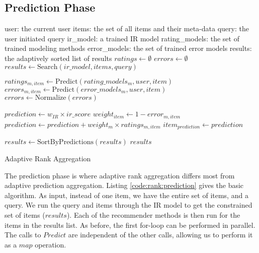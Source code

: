 \clearpage
\subsection{Prediction Phase}

\begin{algorithm}[t]
  \begin{algorithmic}[1]
  \REQUIRE user: the current user
  \REQUIRE items: the set of all items and their meta-data
  \REQUIRE query: the user initiated query
  \REQUIRE ir\_model: a trained IR model
  \REQUIRE rating\_models: the set of trained modeling methods 
  \REQUIRE error\_models: the set of trained error models
  \ENSURE  results: the adaptively sorted list of results
    \STATE $ratings \gets \emptyset$
    \STATE $errors  \gets \emptyset$
    \STATE $results \gets \mathrm{Search}(ir\_model, items, query)$
    
        \STATE $ratings_{m,item} \gets \mathrm{Predict}(rating\_models_m, user, item)$
        \STATE $errors_{m,item}  \gets \mathrm{Predict}(error\_models_m, user, item)$
      \ENDFOR 
    \ENDFOR
    \STATE $errors \gets \mathrm{Normalize}(errors)$

      \STATE $prediction \gets w_{IR} \times ir\_score$
        \STATE $weight_{item} \gets 1 - error_{m,item}$
        \STATE $prediction \gets prediction + weight_m \times ratings_{m,item}$
      \ENDFOR
      \STATE $item_{prediction} \gets prediction$
    \ENDFOR
    
    \STATE $results \gets \mathrm{SortByPredictions}(results)$
  \RETURN $results$

  \end{algorithmic}
  \caption[Adaptive Rank Aggregation]{Adaptive Rank Aggregation}
  \label{code:rank:prediction}
\end{algorithm}

The prediction phase is where adaptive rank aggregation differs most from adaptive prediction aggregation.
Listing \ref{code:rank:prediction} gives the basic algorithm.
As input, instead of one item, we have the entire set of items, and a query.
We run the query and items through the IR model to get the constrained set of items ($results$).
Each of the recommender methods is then run for the items in the results list.
As before, the first for-loop can be performed in parallel.
The calls to $Predict$ are independent of the other calls,
allowing us to perform it as a $map$ operation.

